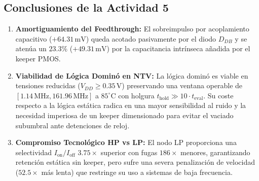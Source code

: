 \subsection{Conclusiones de la Actividad 5}
\begin{enumerate}[leftmargin=1.4em,itemsep=0.01em]
  \item \textbf{Amortiguamiento del Feedthrough:} El sobreimpulso por acoplamiento capacitivo ($+64.31\,\text{mV}$) queda acotado pasivamente por el diodo $D_{DB}$ y se atenúa un $23.3\%$ ($+49.31\,\text{mV}$) por la capacitancia intrínseca añadida por el keeper PMOS.
  \item \textbf{Viabilidad de Lógica Dominó en NTV:} La lógica dominó es viable en tensiones reducidas ($V_{DD} \ge 0.35\,\text{V}$) preservando una ventana operable de $[1.14\,\text{MHz}, 161.96\,\text{MHz}]$ a $85^\circ\text{C}$ con holgura $t_{\text{hold}} \gg 10 \cdot t_{\text{eval}}$. Su coste respecto a la lógica estática radica en una mayor sensibilidad al ruido y la necesidad imperiosa de un keeper dimensionado para evitar el vaciado subumbral ante detenciones de reloj.
  \item \textbf{Compromiso Tecnológico HP vs LP:} El nodo LP proporciona una selectividad $I_{\text{on}}/I_{\text{off}}$ $3.75\times$ superior con fugas $186\times$ menores, garantizando retención estática sin keeper, pero sufre una severa penalización de velocidad ($52.5\times$ más lenta) que restringe su uso a sistemas de baja frecuencia.
\end{enumerate}
